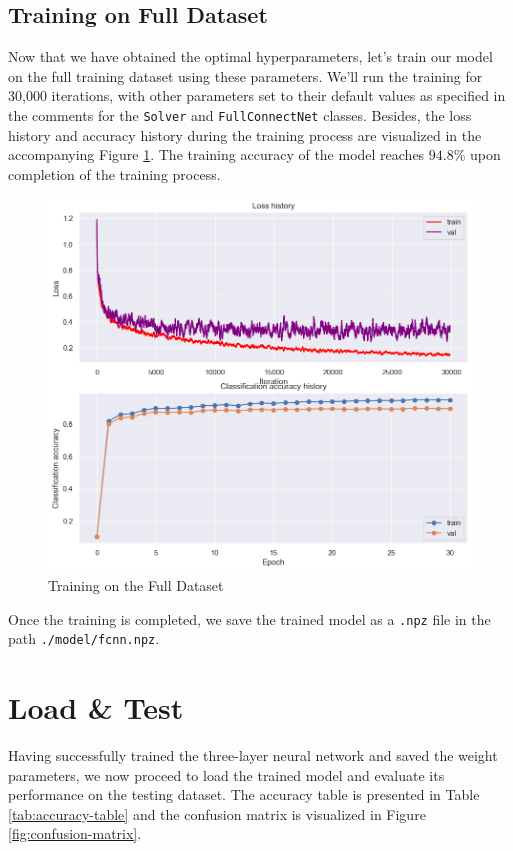\documentclass[10pt,a4paper,twoside]{tau}
\begin{document}
\subsection{Training on Full Dataset}

Now that we have obtained the optimal hyperparameters, let's train our model on the full training dataset using these parameters. We'll run the training for 30,000 iterations, with other parameters set to their default values as specified in the comments for the \texttt{Solver} and \texttt{FullConnectNet} classes. Besides, the loss history and accuracy history during the training process are visualized in the accompanying Figure \ref{fig:full-train}. The training accuracy of the model reaches $94.8\%$ upon completion of the training process.

\begin{figure}[htbp]
    \centering
    \includegraphics[scale=0.35]{images/full_train.png}
    \caption{Training on the Full Dataset}
    \label{fig:full-train}
\end{figure}

Once the training is completed, we save the trained model as a \texttt{.npz} file in the path \texttt{./model/fcnn.npz}.


\section{Load \& Test}

Having successfully trained the three-layer neural network and saved the weight parameters, we now proceed to load the trained model and evaluate its performance on the testing dataset. The accuracy table is presented in Table \ref{tab:accuracy-table} and the confusion matrix is visualized in Figure \ref{fig:confusion-matrix}.
\end{document}
